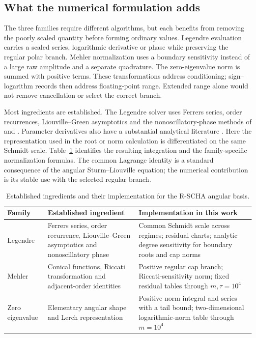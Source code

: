 ﻿\documentclass[11pt,a4paper]{article}
\newcommand{\RSCHA}{\textsc{R-SCHA}\xspace}
\begin{document}
\subsection{What the numerical formulation adds}

The three families require different algorithms, but each benefits from removing the poorly scaled quantity before forming ordinary values. Legendre evaluation carries a scaled series, logarithmic derivative or phase while preserving the regular polar branch. Mehler normalization uses a boundary sensitivity instead of a large raw amplitude and a separate quadrature. The zero-eigenvalue norm is summed with positive terms. These transformations address conditioning; sign--logarithm records then address floating-point range. Extended range alone would not remove cancellation or select the correct branch.

Most ingredients are established. The Legendre solver uses Ferrers series, order recurrences, Liouville--Green asymptotics and the nonoscillatory-phase methods of \citet{BremerRokhlin2017} and \citet{Bremer2018}. Parameter derivatives also have a substantial analytical literature \citep{Cohl2011,Szmytkowski2011,Szmytkowski2012}. Here the representation used in the root or norm calculation is differentiated on the same Schmidt scale. Table~\ref{tab:novelty} identifies the resulting integration and the family-specific normalization formulas. The common Lagrange identity is a standard consequence of the angular Sturm--Liouville equation; the numerical contribution is its stable use with the selected regular branch.

\begin{table}[htbp]
\centering
\footnotesize
\caption{Established ingredients and their implementation for the \RSCHA angular basis.}
\label{tab:novelty}
\begin{tabularx}{\textwidth}{@{}l>{\raggedright\arraybackslash}X>{\raggedright\arraybackslash}X@{}}
\toprule
Family & Established ingredient & Implementation in this work\\
\midrule
Legendre & Ferrers series, order recurrence, Liouville--Green asymptotics and nonoscillatory phase & Common Schmidt scale across regimes; residual charts; analytic degree sensitivity for boundary roots and cap norms\\
Mehler & Conical functions, Riccati transformation and adjacent-order identities & Positive regular cap branch; Riccati-sensitivity norm; fixed residual tables through $m,\tau=10^4$\\
Zero eigenvalue & Elementary angular shape and Lerch representation & Positive norm integral and series with a tail bound; two-dimensional logarithmic-norm table through $m=10^4$\\
\bottomrule
\end{tabularx}
\end{table}
\end{document}
